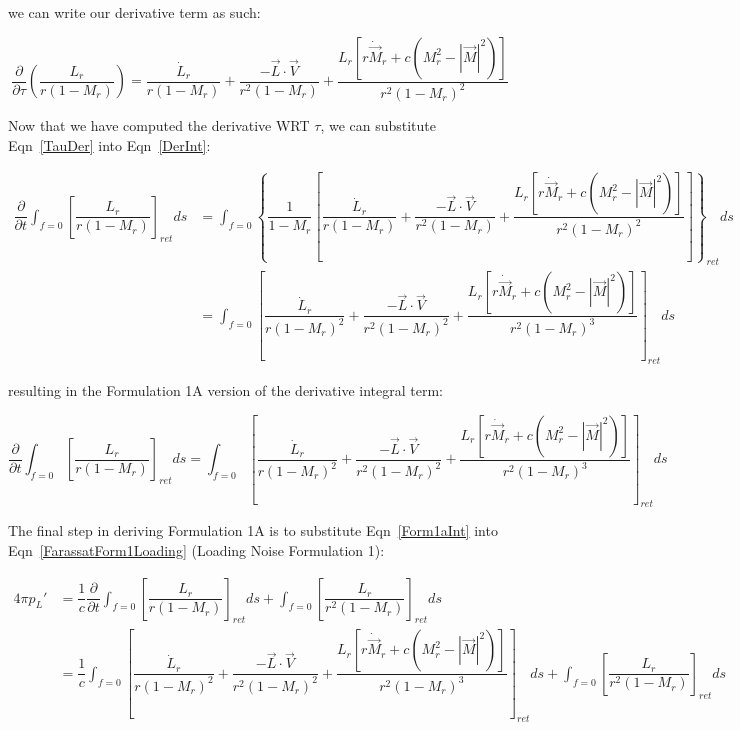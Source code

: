 \documentclass[]{aiaa-tc}%
\begin{document}
\noindent we can write our derivative term as such:

\begin{equation} \label{TauDer}
\dfrac{\partial}{\partial \tau} \left( \dfrac{L_r}{r (1 - M_r)}  \right)
= \dfrac{\dot{L}_r}{r (1 - M_r)}
    + \dfrac{-\vec{L}\cdot\vec{V}}{r^2 (1 - M_r)}
    + \dfrac{ L_r \left[
        r\dot{\vec{M}}_r + c \left( M_r^2 - |\vec{M}|^2 \right) \right] }
        {r^2 (1 - M_r)^2}
\end{equation}

Now that we have computed the derivative WRT $\tau$, we can substitute Eqn~\ref{TauDer} into Eqn~\ref{DerInt}:

\begin{align*}
\dfrac{\partial}{\partial t}
      \int_{f=0} \left[ \dfrac{L_r}{r   (1 - M_r)} \right]_{ret} ds
&= \int_{f=0} \left\{
    \dfrac{1}{1 - M_r} \left[
    \dfrac{\dot{L}_r}{r (1 - M_r)}
    + \dfrac{-\vec{L}\cdot\vec{V}}{r^2 (1 - M_r)}
    + \dfrac{ L_r \left[
        r\dot{\vec{M}}_r + c \left( M_r^2 - |\vec{M}|^2 \right) \right] }
        {r^2 (1 - M_r)^2} \right]
    \right\}_{ret} ds \\
&= \int_{f=0} \left[
    \dfrac{\dot{L}_r}{r (1 - M_r)^2}
    + \dfrac{-\vec{L}\cdot\vec{V}}{r^2 (1 - M_r)^2}
    + \dfrac{ L_r \left[
        r\dot{\vec{M}}_r + c \left( M_r^2 - |\vec{M}|^2 \right) \right] }
        {r^2 (1 - M_r)^3}
    \right]_{ret} ds
\end{align*}

\noindent resulting in the Formulation 1A version of the derivative integral term:

\begin{equation} \label{Form1aInt}
\dfrac{\partial}{\partial t}
      \int_{f=0} \left[ \dfrac{L_r}{r   (1 - M_r)} \right]_{ret} ds
= \int_{f=0} \left[
    \dfrac{\dot{L}_r}{r (1 - M_r)^2}
    + \dfrac{-\vec{L}\cdot\vec{V}}{r^2 (1 - M_r)^2}
    + \dfrac{ L_r \left[
        r\dot{\vec{M}}_r + c \left( M_r^2 - |\vec{M}|^2 \right) \right] }
        {r^2 (1 - M_r)^3}
    \right]_{ret} ds
\end{equation}

The final step in deriving Formulation 1A is to substitute Eqn~\ref{Form1aInt} into Eqn~\ref{FarassatForm1Loading} (Loading Noise Formulation 1):

\begin{align*}
4\pi p_{L}' &= \dfrac{1}{c} \dfrac{\partial}{\partial t}
      \int_{f=0} \left[ \dfrac{L_r}{r   (1 - M_r)} \right]_{ret} ds
    + \int_{f=0} \left[ \dfrac{L_r}{r^2 (1 - M_r)} \right]_{ret} ds \\
&= \dfrac{1}{c} \int_{f=0} \left[
    \dfrac{\dot{L}_r}{r (1 - M_r)^2}
    + \dfrac{-\vec{L}\cdot\vec{V}}{r^2 (1 - M_r)^2}
    + \dfrac{ L_r \left[
        r\dot{\vec{M}}_r + c \left( M_r^2 - |\vec{M}|^2 \right) \right] }
        {r^2 (1 - M_r)^3}
    \right]_{ret} ds
    + \int_{f=0} \left[ \dfrac{L_r}{r^2 (1 - M_r)} \right]_{ret} ds
\end{align*}
\end{document}
